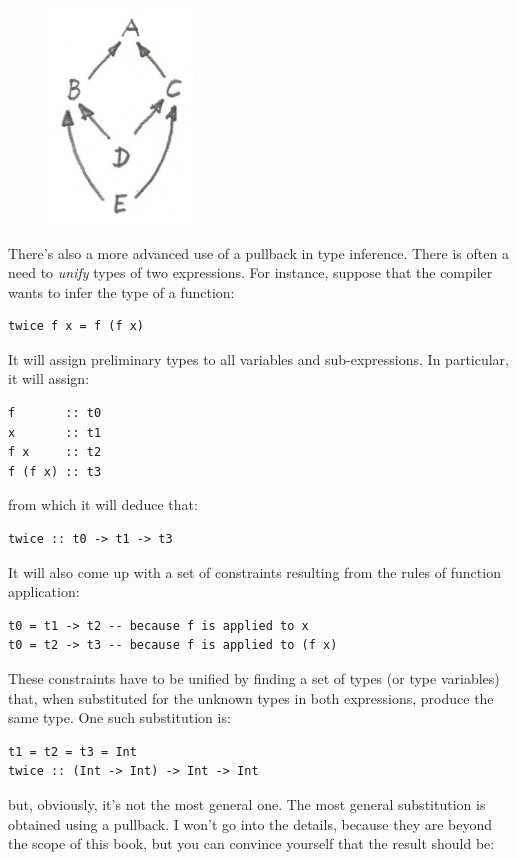 \begin{figure}[H]
\centering
\includegraphics[width=40mm]{images/classes.jpg}
\end{figure}

\noindent
There's also a more advanced use of a pullback in type inference. There
is often a need to \emph{unify} types of two expressions. For instance,
suppose that the compiler wants to infer the type of a function:

\begin{Verbatim}
twice f x = f (f x)
\end{Verbatim}
It will assign preliminary types to all variables and sub-expressions.
In particular, it will assign:

\begin{Verbatim}
f       :: t0
x       :: t1
f x     :: t2
f (f x) :: t3
\end{Verbatim}
from which it will deduce that:

\begin{Verbatim}
twice :: t0 -> t1 -> t3
\end{Verbatim}
It will also come up with a set of constraints resulting from the rules
of function application:

\begin{Verbatim}
t0 = t1 -> t2 -- because f is applied to x 
t0 = t2 -> t3 -- because f is applied to (f x)
\end{Verbatim}
These constraints have to be unified by finding a set of types (or type
variables) that, when substituted for the unknown types in both
expressions, produce the same type. One such substitution is:

\begin{Verbatim}
t1 = t2 = t3 = Int 
twice :: (Int -> Int) -> Int -> Int
\end{Verbatim}
but, obviously, it's not the most general one. The most general
substitution is obtained using a pullback. I won't go into the details,
because they are beyond the scope of this book, but you can convince
yourself that the result should be:


